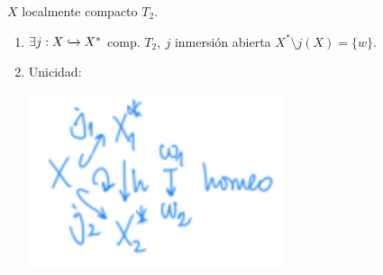 \begin{prop}
$X$ localmente compacto $T_2$.
\begin{enumerate}
    \item $\exists j : X \xhookrightarrow{} X^*$ comp. $T_2,\ j$ inmersión abierta $X^* \setminus j\left( X \right) = \{w\}$.
    \item Unicidad: 
    \begin{center}
        \includegraphics[scale=0.3]{images/comp_pto_prop_1} 
    \end{center}
\end{enumerate}
\end{prop}
